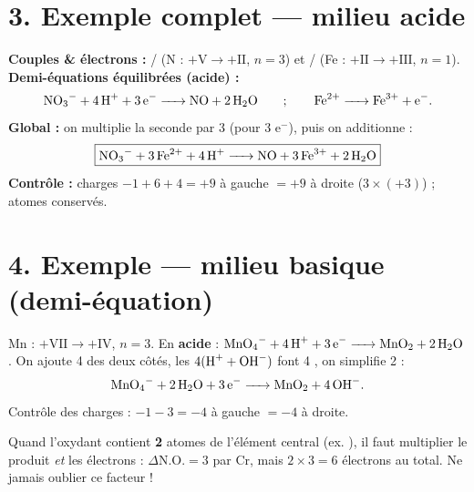 \documentclass[11pt,a4paper]{article}
\newcommand{\NO}{\ensuremath{\mathrm{N.O.}}}
\begin{document}
\section*{3. Exemple complet — milieu acide}
\begin{exemple}
\textbf{Couples \& électrons :} / (N : $+\mathrm{V}\to+\mathrm{II}$, $n=3$) et
/ (Fe : $+\mathrm{II}\to+\mathrm{III}$, $n=1$).\\[2pt]
\textbf{Demi-équations équilibrées (acide) :}
\[
\ce{NO3^- + 4 H+ + 3 e^- -> NO + 2 H2O} \qquad ; \qquad \ce{Fe^{2+} -> Fe^{3+} + e^-}.
\]
\textbf{Global :} on multiplie la seconde par 3 (pour 3 e$^-$), puis on additionne :
\[
\boxed{\ce{NO3^- + 3 Fe^{2+} + 4 H+ -> NO + 3 Fe^{3+} + 2 H2O}}
\]
\textbf{Contrôle :} charges $-1+6+4=+9$ à gauche $=+9$ à droite ($3\times(+3)$) ; atomes conservés. \checkmark
\end{exemple}

\section*{4. Exemple — milieu basique (demi-équation)}
\begin{exemple}
Mn : $+\mathrm{VII}\to+\mathrm{IV}$, $n=3$. En \textbf{acide} : $\ce{MnO4^- + 4 H+ + 3 e^- -> MnO2 + 2 H2O}$.
On ajoute 4  des deux côtés, les $4(\ce{H+}+\ce{OH^-})$ font 4 , on simplifie 2  :
\[
\ce{MnO4^- + 2 H2O + 3 e^- -> MnO2 + 4 OH^-}.
\]
Contrôle des charges : $-1-3=-4$ à gauche $=-4$ à droite. \checkmark
\end{exemple}

\begin{attention}
Quand l'oxydant contient \textbf{2} atomes de l'élément central (ex. ),
il faut multiplier le produit \emph{et} les électrons : $\Delta\NO=3$ par Cr, mais $2\times3=6$
électrons au total. Ne jamais oublier ce facteur !
\end{attention}
\end{document}
